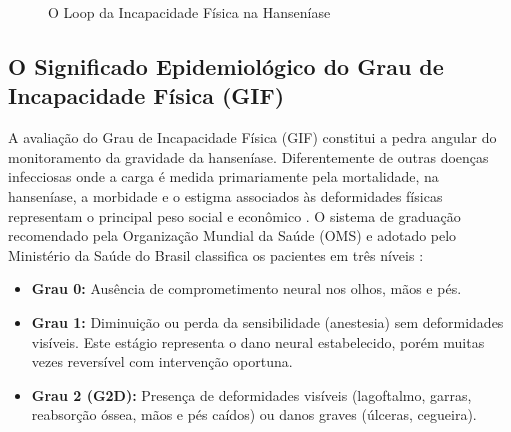 \begin{figure}[H]
\centering
\caption{O Loop da Incapacidade Física na Hanseníase}
\label{fig:loop_incapacidade}
\end{figure}

\subsection{O Significado Epidemiológico do Grau de Incapacidade Física (GIF)}

A avaliação do Grau de Incapacidade Física (GIF) constitui a pedra angular do monitoramento da gravidade da hanseníase. Diferentemente de outras doenças infecciosas onde a carga é medida primariamente pela mortalidade, na hanseníase, a morbidade e o estigma associados às deformidades físicas representam o principal peso social e econômico \cite{nery2021physical}. O sistema de graduação recomendado pela Organização Mundial da Saúde (OMS) e adotado pelo Ministério da Saúde do Brasil classifica os pacientes em três níveis \cite{boletim2025hanseniase, estrat_pa_2024}:

\begin{itemize}
    \item \textbf{Grau 0:} Ausência de comprometimento neural nos olhos, mãos e pés.
    \item \textbf{Grau 1:} Diminuição ou perda da sensibilidade (anestesia) sem deformidades visíveis. Este estágio representa o dano neural estabelecido, porém muitas vezes reversível com intervenção oportuna.
    \item \textbf{Grau 2 (G2D):} Presença de deformidades visíveis (lagoftalmo, garras, reabsorção óssea, mãos e pés caídos) ou danos graves (úlceras, cegueira).
\end{itemize}

